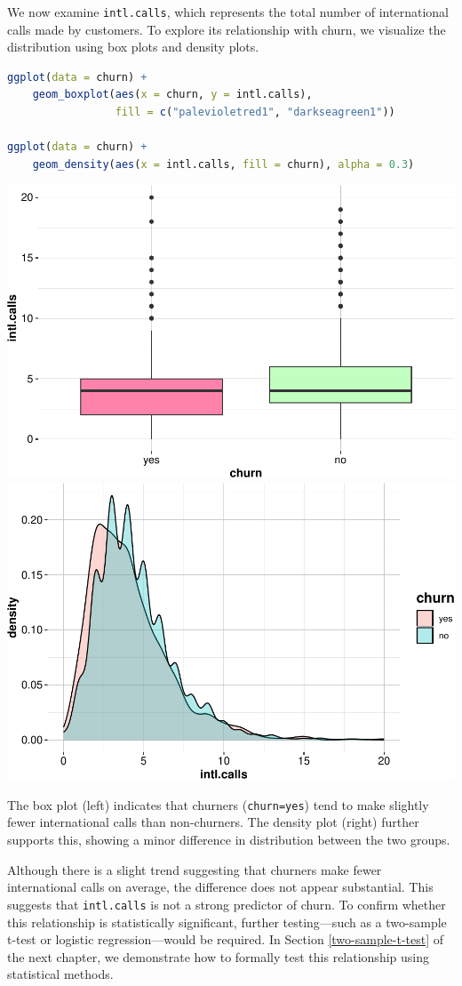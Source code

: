 \documentclass[
]{book}
\newcommand{\passthrough}[1]{#1}
\theoremstyle{definition}
\theoremstyle{definition}
\theoremstyle{definition}
\theoremstyle{definition}
\theoremstyle{remark}
\begin{document}
We now examine \passthrough{\lstinline!intl.calls!}, which represents the total number of international calls made by customers. To explore its relationship with churn, we visualize the distribution using box plots and density plots.

\begin{lstlisting}[language=R]
ggplot(data = churn) +
    geom_boxplot(aes(x = churn, y = intl.calls), 
                 fill = c("palevioletred1", "darkseagreen1"))

ggplot(data = churn) +
    geom_density(aes(x = intl.calls, fill = churn), alpha = 0.3)
\end{lstlisting}

\includegraphics[width=0.5\linewidth]{EDA_files/figure-latex/unnamed-chunk-14-1} \includegraphics[width=0.5\linewidth]{EDA_files/figure-latex/unnamed-chunk-14-2}

The box plot (left) indicates that churners (\passthrough{\lstinline!churn=yes!}) tend to make slightly fewer international calls than non-churners. The density plot (right) further supports this, showing a minor difference in distribution between the two groups.

Although there is a slight trend suggesting that churners make fewer international calls on average, the difference does not appear substantial. This suggests that \passthrough{\lstinline!intl.calls!} is not a strong predictor of churn. To confirm whether this relationship is statistically significant, further testing---such as a two-sample t-test or logistic regression---would be required. In Section \ref{two-sample-t-test} of the next chapter, we demonstrate how to formally test this relationship using statistical methods.
\end{document}

